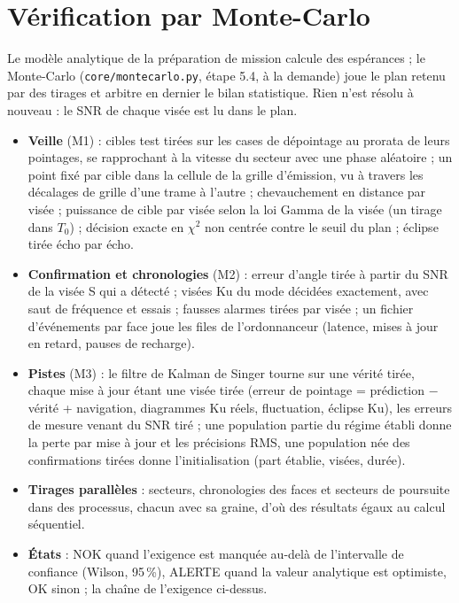 \documentclass[11pt,a4paper]{article}
\newcommand{\code}[1]{\texttt{\small #1}}
\begin{document}
\section{Vérification par Monte-Carlo}\label{sec:mc}
Le modèle analytique de la préparation de mission calcule des espérances ; le Monte-Carlo (\code{core/montecarlo.py},
étape 5.4, à la demande) joue le plan retenu par des tirages et arbitre en dernier le bilan statistique. Rien n'est
résolu à nouveau : le SNR de chaque visée est lu dans le plan.
\begin{itemize}
  \item \textbf{Veille} (M1) : cibles test tirées sur les cases de dépointage au prorata de leurs pointages, se
        rapprochant à la vitesse du secteur avec une phase aléatoire ; un point fixé par cible dans la cellule de la
        grille d'émission, vu à travers les décalages de grille d'une trame à l'autre ; chevauchement en distance par
        visée ; puissance de cible par visée selon la loi Gamma de la visée (un tirage dans $T_0$) ; décision exacte en
        $\chi^2$ non centrée contre le seuil du plan ; éclipse tirée écho par écho.
  \item \textbf{Confirmation et chronologies} (M2) : erreur d'angle tirée à partir du SNR de la visée S qui a détecté ;
        visées Ku du mode décidées exactement, avec saut de fréquence et essais ; fausses alarmes tirées par visée ; un
        fichier d'événements par face joue les files de l'ordonnanceur (latence, mises à jour en retard, pauses de
        recharge).
  \item \textbf{Pistes} (M3) : le filtre de Kalman de Singer tourne sur une vérité tirée, chaque mise à jour étant une
        visée tirée (erreur de pointage = prédiction $-$ vérité + navigation, diagrammes Ku réels, fluctuation, éclipse
        Ku), les erreurs de mesure venant du SNR tiré ; une population partie du régime établi donne la perte par mise à
        jour et les précisions RMS, une population née des confirmations tirées donne l'initialisation (part établie,
        visées, durée).
  \item \textbf{Tirages parallèles} : secteurs, chronologies des faces et secteurs de poursuite dans des processus,
        chacun avec sa graine, d'où des résultats égaux au calcul séquentiel.
  \item \textbf{États} : NOK quand l'exigence est manquée au-delà de l'intervalle de confiance (Wilson, 95\,\%),
        ALERTE quand la valeur analytique est optimiste, OK sinon ; la chaîne de l'exigence ci-dessus.
\end{itemize}
\end{document}
